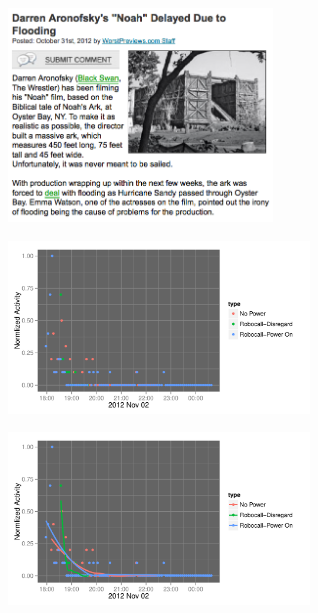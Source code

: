 \documentclass{beamer}
\begin{document}

\begin{frame}
  \begin{center}
    \includegraphics[width=7cm]{./imgs/flooding.png}
  \end{center}
\end{frame}


\begin{frame}
\begin{center}
\end{center}
\end{frame}


\begin{frame}
  \begin{center}
    \includegraphics[width=8cm]{./imgs/fake.pdf}
  \end{center}
\end{frame}

\begin{frame}
  \begin{center}
    \includegraphics[width=8cm]{./imgs/fake_fit.pdf}
  \end{center}
\end{frame}
\end{document}
